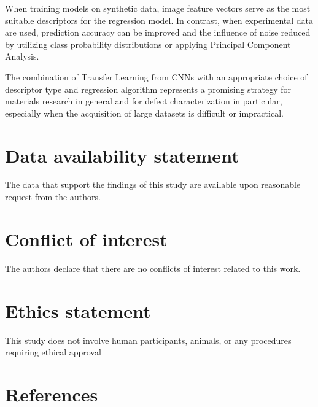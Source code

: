 \documentclass[10pt]{iopart}
\begin{document}
When training models on synthetic data, image feature vectors serve as the most suitable descriptors for the regression model.
In contrast, when experimental data are used, prediction accuracy can be improved and the influence of noise reduced
by utilizing class probability distributions or applying Principal Component Analysis.

The combination of Transfer Learning from CNNs with an appropriate choice of descriptor type
and regression algorithm represents a promising strategy for materials research in general
and for defect characterization in particular,
especially when the acquisition of large datasets is difficult or impractical.

\section*{Data availability statement}
The data that support the findings of this study are available upon reasonable request from the authors.

\section*{Conflict of interest}
The authors declare that there are no conflicts of interest related to this work.

\section*{Ethics statement}
This study does not involve human participants, animals, or
any procedures requiring ethical approval


\section*{References}



\end{document}
